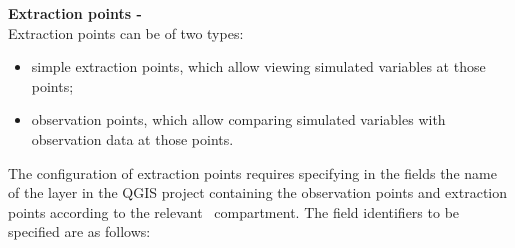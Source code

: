 \vspace{8pt}

\textbf{Extraction points - } \\
Extraction points can be of two types:
\begin{itemize}
    \item[$\bullet$] simple extraction points, which allow
    viewing simulated variables at those points;
    \item[$\bullet$] observation points, which allow comparing simulated variables with observation data at those points.
\end{itemize}



The configuration of extraction points requires specifying in the  fields the name of the layer in the QGIS project containing the observation points and extraction points according to the relevant \cws~compartment. The field identifiers to be specified are as follows:
\vspace{8pt}

